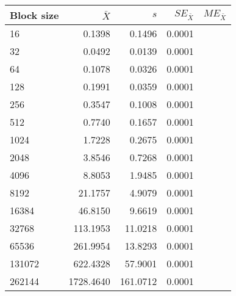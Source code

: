\begin{tabular}{lrrrr}\toprule
{\small Block size} & $\bar{X}$ & $s$ & $SE_{\bar{X}}$ & $ME_{\bar{X}}$ \\\midrule
16 & 0.1398 & 0.1496 &  0.0001\\
32 & 0.0492 & 0.0139 &  0.0001\\
64 & 0.1078 & 0.0326 &  0.0001\\
128 & 0.1991 & 0.0359 &  0.0001\\
256 & 0.3547 & 0.1008 &  0.0001\\
512 & 0.7740 & 0.1657 &  0.0001\\
1024 & 1.7228 & 0.2675 &  0.0001\\
2048 & 3.8546 & 0.7268 &  0.0001\\
4096 & 8.8053 & 1.9485 &  0.0001\\
8192 & 21.1757 & 4.9079 &  0.0001\\
16384 & 46.8150 & 9.6619 &  0.0001\\
32768 & 113.1953 & 11.0218 &  0.0001\\
65536 & 261.9954 & 13.8293 &  0.0001\\
131072 & 622.4328 & 57.9001 &  0.0001\\
262144 & 1728.4640 & 161.0712 &  0.0001\\
\bottomrule
\end{tabular}
